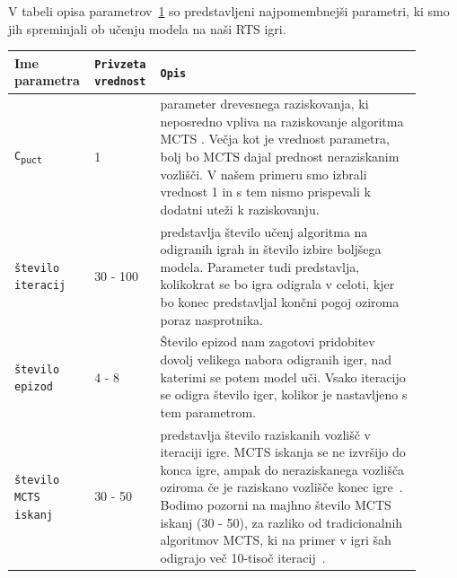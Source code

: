 \documentclass[a4paper, 12pt]{book}
\begin{document}
V tabeli opisa parametrov~\ref{tableParameters1} so predstavljeni najpomembnejši parametri, ki smo jih spreminjali ob učenju modela na naši RTS igri.
\begin{table}
	\begin{center}
		\begin{tabular}{p{0.15\linewidth}|p{0.13\linewidth}|p{0.62\linewidth}}
			Ime parametra                             & {\tt Privzeta vrednost} & {\tt Opis} \\ \hline
			{\tt C\textsubscript{puct}}               & 1 						& parameter drevesnega raziskovanja, ki neposredno vpliva na raziskovanje algoritma MCTS . 
																				  Večja kot je vrednost parametra, bolj bo MCTS dajal prednost neraziskanim vozlišči. 
																				  V našem primeru smo izbrali vrednost 1 in s tem nismo prispevali k dodatni uteži k raziskovanju.\\
			{\tt število iteracij}                    & 30 - 100				& predstavlja število učenj algoritma na odigranih igrah in število izbire boljšega modela.
																				  Parameter tudi predstavlja, kolikokrat se bo igra odigrala v celoti, kjer bo konec predstavljal končni pogoj oziroma poraz nasprotnika.\\
			{\tt število epizod}                      & 4 - 8 					& Število epizod nam zagotovi pridobitev dovolj velikega nabora odigranih iger, nad katerimi se potem model uči.
																				  Vsako iteracijo se odigra število iger, kolikor je nastavljeno s tem parametrom.\\
			{\tt število MCTS iskanj}                 & 30 - 50					& predstavlja število raziskanih vozlišč v iteraciji igre. 
														 						  MCTS iskanja se ne izvršijo do konca igre, ampak do neraziskanega vozlišča oziroma če je raziskano vozlišče konec igre~\cite{silver2018general}.
														 						  Bodimo pozorni na majhno število MCTS iskanj (30 - 50), za razliko od tradicionalnih algoritmov MCTS, ki na primer v igri šah odigrajo več 10-tisoč iteracij~\cite{kohne}.\\ 
		\end{tabular}
	\end{center}
	\label{tableParameters1}
\end{table}
\end{document}
